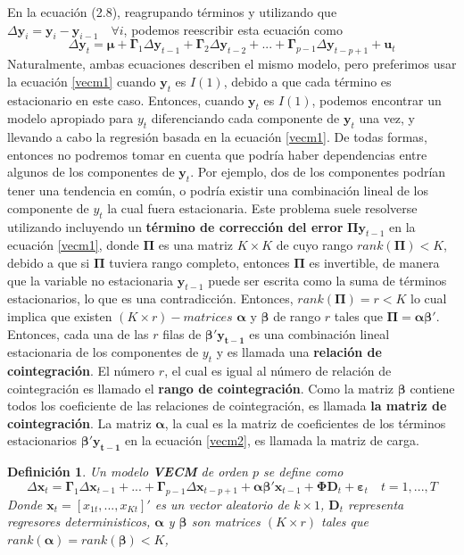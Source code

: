 \documentclass[12pt, twoside]{book}\usepackage[]{graphicx}\usepackage[]{color}
\let\bf\mathbf
\numberwithin{equation}{section}
\numberwithin{theorem}{section}
\numberwithin{teorema}{section}
\newtheorem{defi}{Definición}
\newenvironment{defin}
      {\begin{shaded}\begin{defi}}
      {\end{defi}\end{shaded}}
\numberwithin{defi}{section}
\numberwithin{prop}{section}
\numberwithin{defi}{section}
\theoremstyle{plain}
\begin{document}
En la ecuación (2.8), reagrupando términos y utilizando que $\Delta \bf{y}_{i} = \bf{y}_{i}-\bf{y}_{i-1}\quad \forall i$, podemos reescribir esta ecuación como 
\begin{equation}\label{vecm1}
\Delta \bf{y}_{t}=\mathbf{\mu}+\mathbf{\Gamma}_{1}\Delta \bf{y}_{t-1}+\mathbf{\Gamma}_{2}\Delta \bf{y}_{t-2}+...+\mathbf{\Gamma}_{p-1}\Delta \bf{y}_{t-p+1}+\bf{u}_{t}
\end{equation} 
Naturalmente, ambas ecuaciones describen el mismo modelo, pero preferimos usar la ecuación \eqref{vecm1} cuando $\bf{y}_{t}$ es $I(1)$, debido a que cada término es estacionario en este caso. Entonces, cuando $\bf{y}_{t}$ es $I(1)$, podemos encontrar un modelo apropiado para $y_{t}$ diferenciando cada componente de $\bf{y}_{t}$ una vez, y llevando a cabo la regresión basada en la ecuación \eqref{vecm1}. De todas formas, entonces no podremos tomar en cuenta que podría haber dependencias entre algunos de los componentes de $\bf{y}_{t}$. Por ejemplo, dos de los componentes podrían tener una tendencia en común, o podría existir una combinación lineal de los componente de $y_{t}$ la cual fuera estacionaria. Este problema suele resolverse utilizando incluyendo un \textbf{término de corrección del error} $\mathbf{\Pi}\bf{y}_{t-1}$ en la ecuación \eqref{vecm1}, donde $\mathbf{\Pi}$ es una matriz $K\times K$ de cuyo rango $rank(\mathbf{\Pi})<K$, debido a que si $\mathbf{\Pi}$ tuviera rango completo, entonces $\mathbf{\Pi}$  es invertible, de manera que la variable no estacionaria $\bf{y}_{t-1}$ puede ser escrita como la suma de términos estacionarios, lo que es una contradicción. Entonces, $rank(\mathbf{\Pi})=r<K$ lo cual implica que existen $(K\times r)-matrices$ $\boldsymbol{\alpha}$ y $\boldsymbol{\beta}$ de rango $r$ tales que $\mathbf{\Pi}=\boldsymbol{\alpha}\boldsymbol{\beta}'$. Entonces, cada una de las $r$ filas de $\boldsymbol{\beta}'\bf{y_{t-1}}$ es una combinación lineal estacionaria de los componentes de $y_{t}$ y es llamada una \textbf{relación de cointegración}. El número $r$, el cual es igual al número de relación de cointegración es llamado el \textbf{rango de cointegración}. Como la matriz $\boldsymbol{\beta}$ contiene todos los coeficiente de las relaciones de cointegración, es llamada \textbf{la matriz de cointegración}. La matriz $\boldsymbol{\alpha}$, la cual es la matriz de coeficientes de los términos estacionarios $\boldsymbol{\beta}'\bf{y_{t-1}}$ en la ecuación \eqref{vecm2}, es llamada la matriz de carga. 

\begin{defin}
Un modelo \textbf{VECM} de orden $p$ se define como 
\begin{equation}\label{vecm2}
\Delta \bf{x}_{t}=\mathbf{\Gamma}_{1}\Delta \bf{x}_{t-1}+...+\mathbf{\Gamma}_{p-1}\Delta \bf{x}_{t-p+1}+\boldsymbol{\alpha\beta}'
\bf{x}_{t-1}+\boldsymbol{\Phi}\mathbf{D}_{t}+\boldsymbol{\varepsilon}_{t} \quad t=1,...,T
\end{equation}
Donde $\bf{x}_{t}=\left[x_{1t},...,x_{Kt}\right]'$ es un vector aleatorio de $k\times 1$, $\mathbf{D}_{t}$ representa regresores deterministicos, $\boldsymbol{\alpha}$ y $\boldsymbol{\beta}$ son matrices $(K\times r)$ tales que $rank(\boldsymbol{\alpha})=rank(\boldsymbol{\beta})<K$, 
\end{defin} 
\end{document}
